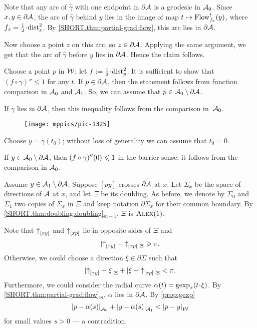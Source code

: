 Note that any arc of $\hat\gamma$ with one endpoint in $\partial \mathcal{A}$
is a geodesic in $\mathcal{A}_0$.
Since $x,y\in \partial \mathcal{A}$, the arc of $\hat\gamma$ behind $y$ lies in the image of map $t\mapsto \mathop{\rm Flow}\nolimits^t_{f_x}(y)$, where $f_x=\tfrac12\cdot\distfun^2_x$.
By \ref{SHORT.thm:partial-grad:flow}, this arc lies in $\partial\mathcal{A}$.

Now choose a point $z$ on this arc, so $z\in \partial\mathcal{A}$.
Applying the same argument, we get that the arc of $\hat\gamma$ before $y$ lies in $\partial\mathcal{A}$.
Hence the claim follows.\claimqeds

Choose a point $p$ in $\mathcal{W}$;
let $f\df\tfrac12\cdot\distfun_p^2$.
It is sufficient to show that $(f\circ\gamma)''\le 1$ for any $t$.
If $p\in \partial\mathcal{A}$, then the statement follows from function comparison in $\mathcal{A}_0$ and $\mathcal{A}_1$.
So, we can assume that $p\in \mathcal{A}_0\setminus \partial\mathcal{A}$.

If $\gamma$ lies in $\partial \mathcal{A}$, then this inequality follows from the comparison in~$\mathcal{A}_0$.

\begin{wrapfigure}{r}{55mm}
\vskip-2mm
\centering
\texttt{[image: mppics/pic-1325]}
\end{wrapfigure}

Choose $y=\gamma(t_0)$; without loss of generality we can assume that $t_0=0$.

If $y\in \mathcal{A}_0\setminus\partial\mathcal{A}$, then $(f\circ\gamma)''(0)\leqslant 1$ in the barrier sense;
it follows from the comparison in $\mathcal{A}_0$.

Assume $y\in \mathcal{A}_1\setminus\partial\mathcal{A}$.
Suppose $[py]$ crosses $\partial\mathcal{A}$ at $x$.
Let $\Sigma_x$ be the space of directions of $\mathcal{A}$ at $x$,
and let $\Xi$ be its doubling.
As before, we denote by $\Sigma_0$ and $\Sigma_1$ two copies of $\Sigma_x$ in  $\Xi$
and keep notation $\partial\Sigma_x$ for their common boundary.
By \ref{SHORT.thm:doubling:doubling}$_{m-1}$, $\Xi$ is $\textsc{Alex}(1)$.

Note that ${\uparrow}_{[{x}{y}]_{{}}}$ and ${\uparrow}_{[{x}{p}]_{{}}}$ lie in opposite sides of $\Xi$ and
\[|{{\uparrow}_{[{x}{y}]_{{}}}}-{{\uparrow}_{[{x}{p}]_{{}}}}|_{\Xi}^{{}}\geqslant \pi.\]
Otherwise, we could choose a direction $\xi\in\partial\Sigma$ such that
\[|{{\uparrow}_{[{x}{y}]_{{}}}}-{\xi}|_{\Xi}^{{}}+|{\xi}-{{\uparrow}_{[{x}{p}]_{{}}}}|_{\Xi}^{{}}<\pi.\]
Furthermore, we could consider the radial curve $\alpha(t)=\gexp_x(t\cdot \xi)$.
By \ref{SHORT.thm:partial-grad:flow}$_m$, $\alpha$ lies in $\partial \mathcal{A}$.
By \ref{prop:gexp}
\[\dist{p}{\alpha(s)}{\spc{A}_0}
+\dist{y}{\alpha(s)}{\spc{A}_1}
<\dist{p}{y}{\spc{W}}\]
for small values $s>0$
--- a contradition.

